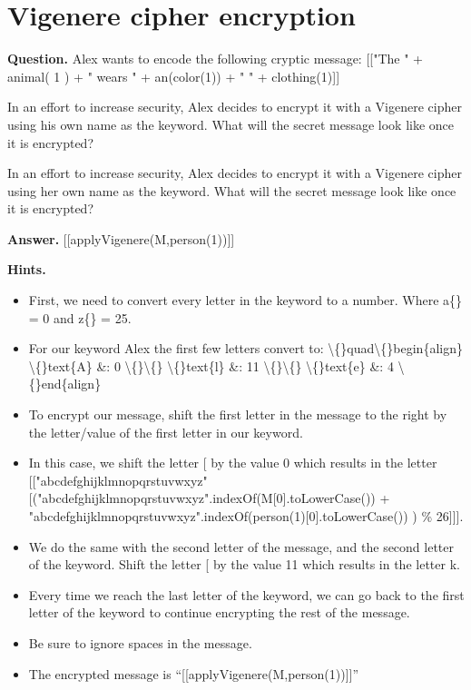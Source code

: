\documentclass{article}
\begin{document}
\section*{Vigenere cipher encryption}
\textbf{Question.} Alex wants to encode the following cryptic message:
                    [["The " + animal( 1 ) + " wears " + an(color(1)) + " " + clothing(1)]]
                    
                        In an effort to increase security, Alex decides to encrypt it with a Vigenere cipher
                        using his own name as the keyword. What will the secret message look like once it is encrypted?
                    
                        In an effort to increase security, Alex decides to encrypt it with a Vigenere cipher
                        using her own name as the keyword. What will the secret message look like once it is encrypted?

\textbf{Answer.} [[applyVigenere(M,person(1))]]

\textbf{Hints.}
\begin{itemize}
  \item First, we need to convert every letter in the keyword to a number.
            Where a\{\} = 0 and z\{\} = 25.
  \item For our keyword Alex the first few letters convert to: 
                \textbackslash\{\}quad\textbackslash\{\}begin\{align\}
                    \textbackslash\{\}text\{A\} \&: 0 \textbackslash\{\}\textbackslash\{\}
                    \textbackslash\{\}text\{l\} \&: 11 \textbackslash\{\}\textbackslash\{\}
                    \textbackslash\{\}text\{e\} \&: 4
                    \textbackslash\{\}end\{align\}
  \item To encrypt our message, shift the first letter in the message to the right by the letter/value
                of the first letter in our keyword.
  \item In this case, we shift the letter [ by the value
                0
                which results in the letter
                [["abcdefghijklmnopqrstuvwxyz"[("abcdefghijklmnopqrstuvwxyz".indexOf(M[0].toLowerCase()) + "abcdefghijklmnopqrstuvwxyz".indexOf(person(1)[0].toLowerCase()) ) \% 26]]].
  \item We do the same with the second letter of the message, and the second letter of the keyword.
                Shift the letter [ by the value 11
                which results in the letter k.
  \item Every time we reach the last letter of the keyword, we can go back to the first letter of the keyword to continue encrypting the rest of the message.
  \item Be sure to ignore spaces in the message.
  \item The encrypted message is “[[applyVigenere(M,person(1))]]”
\end{itemize}
\end{document}
